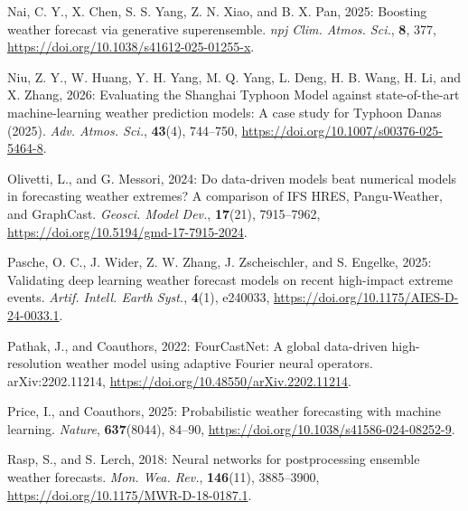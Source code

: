 \documentclass[12pt]{article}
\begin{document}
\begin{Exercises}
\item\hspace*{-6mm}
Nai, C. Y., X. Chen, S. S. Yang, Z. N. Xiao, and B. X. Pan, 2025: Boosting weather forecast via generative superensemble. \textit{npj Clim. Atmos. Sci.}, \textbf{8}, 377, \url{https://doi.org/10.1038/s41612-025-01255-x}.

\item\hspace*{-6mm}
Niu, Z. Y., W. Huang, Y. H. Yang, M. Q. Yang, L. Deng, H. B. Wang, H. Li, and X. Zhang, 2026: Evaluating the Shanghai Typhoon Model against state-of-the-art machine-learning weather prediction models: A case study for Typhoon Danas (2025). \textit{Adv. Atmos. Sci.}, \textbf{43}(4), 744--750, \url{https://doi.org/10.1007/s00376-025-5464-8}.

\item\hspace*{-6mm}
Olivetti, L., and G. Messori, 2024: Do data-driven models beat numerical models in forecasting weather extremes? A comparison of IFS HRES, Pangu-Weather, and GraphCast. \textit{Geosci. Model Dev.}, \textbf{17}(21), 7915--7962, \url{https://doi.org/10.5194/gmd-17-7915-2024}.

\item\hspace*{-6mm}
Pasche, O. C., J. Wider, Z. W. Zhang, J. Zscheischler, and S. Engelke, 2025: Validating deep learning weather forecast models on recent high-impact extreme events. \textit{Artif. Intell. Earth Syst.}, \textbf{4}(1), e240033, \url{https://doi.org/10.1175/AIES-D-24-0033.1}.

\item\hspace*{-6mm}
Pathak, J., and Coauthors, 2022: FourCastNet: A global data-driven high-resolution weather model using adaptive Fourier neural operators. arXiv:2202.11214, \url{https://doi.org/10.48550/arXiv.2202.11214}.

\item\hspace*{-6mm}
Price, I., and Coauthors, 2025: Probabilistic weather forecasting with machine learning. \textit{Nature}, \textbf{637}(8044), 84--90, \url{https://doi.org/10.1038/s41586-024-08252-9}.

\item\hspace*{-6mm}
Rasp, S., and S. Lerch, 2018: Neural networks for postprocessing ensemble weather forecasts. \textit{Mon. Wea. Rev.}, \textbf{146}(11), 3885--3900, \url{https://doi.org/10.1175/MWR-D-18-0187.1}.


\end{Exercises}
\end{document}
